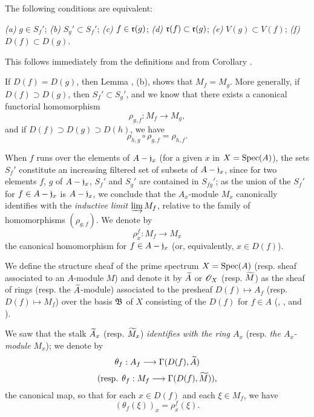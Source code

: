 \begin{lem}[1.3.2]
\label{1.1.3.2}
The following conditions are equivalent:
\begin{center}
\emph{(a)} $g\in S_f'$;
\emph{(b)} $S_g'\subset S_f'$;
\emph{(c)} $f\in\mathfrak{r}(g)$;
\emph{(d)} $\mathfrak{r}(f)\subset\mathfrak{r}(g)$;
\emph{(e)} $V(g)\subset V(f)$;
\emph{(f)} $D(f)\subset D(g)$.
\end{center}
\end{lem}
This follows immediately from the definitions and from
Corollary .

\begin{env}[1.3.3]
\label{1.1.3.3}
If $D(f)=D(g)$, then Lemma , (b), shows that $M_f=M_g$. More generally, if
$D(f)\supset D(g)$, then $S_f'\subset S_g'$, and we know  that there exists
a canonical functorial homomorphism
\[
  \rho_{g,f}:M_f\longrightarrow M_g,
\]
and if $D(f)\supset D(g)\supset D(h)$, we have 
\[
  \rho_{h,g}\circ\rho_{g,f}=\rho_{h,f}.
  \tag{1.3.3.1}
\]
\end{env}

When $f$ runs over the elements of $A-\mathfrak{j}_x$ (for a given $x$ in $X={\mathop{\mathrm{Spec}}\nolimits}(A)$), the
sets $S_f'$ constitute an increasing filtered set of subsets of $A-\mathfrak{j}_x$, since for
two elements $f$, $g$ of $A-\mathfrak{j}_x$, $S_f'$ and $S_g'$ are contained in $S_{fg}'$; as
the union of the $S_f'$ for $f\in A-\mathfrak{j}_x$ is $A-\mathfrak{j}_x$, we conclude
 that the $A_x$-module $M_x$ canonically identifies with the \emph{inductive
limit} $\varinjlim M_f$, relative to the family of homomorphisms $(\rho_{g,f})$. We denote by
\[
  \rho_x^f:M_f\longrightarrow M_x
\]
the canonical homomorphism for $f\in A-\mathfrak{j}_x$ (or, equivalently, $x\in D(f)$).

\begin{defn}[1.3.4]
\label{1.1.3.4}
We define the structure sheaf of the prime spectrum $X={\mathop{\mathrm{Spec}}\nolimits}(A)$ (resp. sheaf associated to
an $A$-module $M$) and denote it by $\widetilde{A}$ or $\mathscr{O}_X$ (resp. $\widetilde{M}$) as the
sheaf of rings (resp. the $\widetilde{A}$-module) associated to the presheaf
$D(f)\mapsto A_f$ (resp. $D(f)\mapsto M_f$) over the basis $\mathfrak{B}$ of $X$ consisting
of the $D(f)$ for $f\in A$ (, , and
).
\end{defn}

We saw  that the stalk $\widetilde{A}_x$ (resp. $\widetilde{M}_x$)
\emph{identifies with the ring $A_x$} (resp. \emph{the $A_x$-module $M_x$}); we denote by
\[
  \theta_f:A_f\longrightarrow\Gamma(D(f),\widetilde{A})
\]
\[
  (\text{resp. }\theta_f:M_f\longrightarrow\Gamma(D(f),\widetilde{M})),
\]
the canonical map, so that for each $x\in D(f)$ and each $\xi\in M_f$, we have
\[
  (\theta_f(\xi))_x=\rho_x^f(\xi).
  \tag{1.3.4.1}
\]

